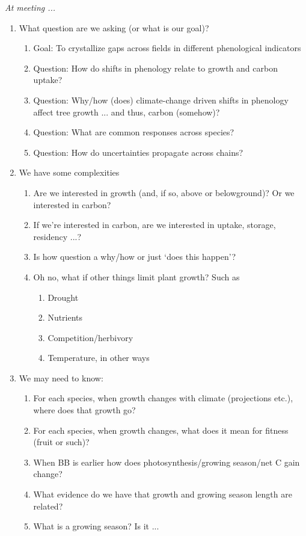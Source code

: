 \documentclass[11pt,letter]{article}
\begin{document}
\emph{At meeting ... }
\begin{enumerate}
\item What question are we asking (or what is our goal)?
\begin{enumerate}
\item Goal: To crystallize gaps across fields in different phenological indicators
\item Question: How do shifts in phenology relate to growth and carbon uptake?
\item Question: Why/how (does) climate-change driven shifts in phenology affect tree growth ... and thus, carbon (somehow)?
\item Question: What are common responses across species?
\item Question: How do uncertainties propagate across chains?
\end{enumerate}
\item We have some complexities
\begin{enumerate}
\item Are we interested in growth (and, if so, above or belowground)? Or we interested in carbon?
\item If we're interested in carbon, are we interested in uptake, storage, residency ...?
\item Is how question a why/how or just `does this happen'?
\item Oh no, what if other things limit plant growth? Such as
\begin{enumerate}
\item Drought
\item Nutrients
\item Competition/herbivory
\item Temperature, in other ways
\end{enumerate}
\end{enumerate}
\item We may need to know:
\begin{enumerate}
\item For each species, when growth changes with climate (projections etc.), where does that growth go?
\item For each species, when growth changes, what does it mean for fitness (fruit or such)?
\item When BB is earlier how does photosynthesis/growing season/net C gain change?
\item What evidence do we have that growth and growing season length are related?
\item What is a growing season? Is it ...

\end{enumerate}
\end{enumerate}
\end{document}
